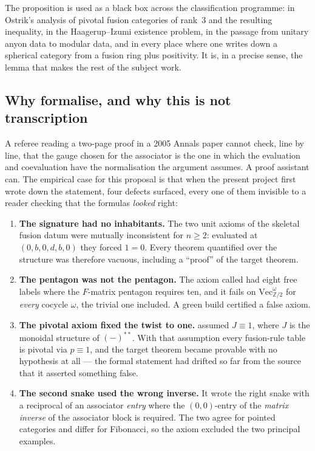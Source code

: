 \documentclass[11pt,a4paper]{article}
\theoremstyle{remark}
\newcommand{\code}[1]{\texttt{\detokenize{#1}}}
\newcommand{\Vect}{\mathrm{Vec}}
\newcommand{\Z}{\mathbb{Z}}
\begin{document}
The proposition is used as a black box across the classification programme: in Ostrik's
analysis of pivotal fusion categories of rank~3 and the resulting inequality, in the
Haagerup--Izumi existence problem, in the passage from unitary anyon data to modular data, and
in every place where one writes down a spherical category from a fusion ring plus positivity.
It is, in a precise sense, the lemma that makes the rest of the subject work.

\subsection{Why formalise, and why this is not transcription}

A referee reading a two-page proof in a 2005 Annals paper cannot check, line by line, that the
gauge chosen for the associator is the one in which the evaluation and coevaluation have the
normalisation the argument assumes. A proof assistant can. The empirical case for this
proposal is that when the present project first wrote down the statement, four defects
surfaced, every one of them invisible to a reader checking that the formulas \emph{looked}
right:

\begin{enumerate}[label=\textbf{D\arabic*.},leftmargin=2.2em]
\item \textbf{The signature had no inhabitants.} The two unit axioms of the skeletal fusion
datum were mutually inconsistent for $n \ge 2$: evaluated at $(0,b,0,d,b,0)$ they forced
$1 = 0$. Every theorem quantified over the structure was therefore vacuous, including a
``proof'' of the target theorem.
\item \textbf{The pentagon was not the pentagon.} The axiom called \code{pentagon} had eight
free labels where the $F$-matrix pentagon requires ten, and it fails on
$\Vect^{\omega}_{\Z/2}$ for \emph{every} cocycle $\omega$, the trivial one included. A green
build certified a false axiom.
\item \textbf{The pivotal axiom fixed the twist to one.} \code{p_fusion} assumed
$J \equiv 1$, where $J$ is the monoidal structure of $(-)^{**}$. With that assumption every
fusion-rule table is pivotal via $p \equiv 1$, and the target theorem became provable with no
hypothesis at all --- the formal statement had drifted so far from the source that it asserted
something false.
\item \textbf{The second snake used the wrong inverse.} It wrote the right snake with a
reciprocal of an associator \emph{entry} where the $(0,0)$-entry of the \emph{matrix inverse} of
the associator block is required. The two agree for pointed categories and differ for
Fibonacci, so the axiom excluded the two principal examples.
\end{enumerate}
\end{document}
